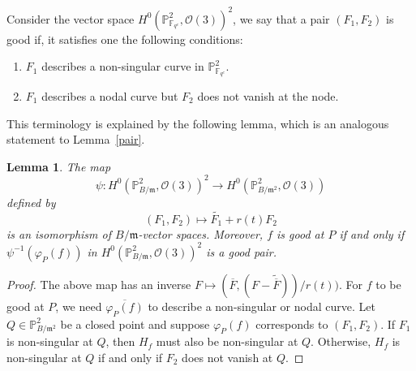 \documentclass[12pt]{article}
\theoremstyle{plain}
\newtheorem{lemma}[equation]{Lemma}
\theoremstyle{definition}
\newcommand{\fm}{\mathfrak{m}}
\newcommand{\IF}{\mathbb{F}}
\newcommand{\IP}{\mathbb{P}}
\newcommand{\sO}{\mathcal{O}}
\newcommand{\<}{\langle}
\renewcommand{\>}{\rangle}
\def\wt{\widetilde}
\begin{document}
Consider the vector space $H^0(\IP^2_{\IF_{q^e}}, \sO(3))^2$, we say that a pair $(F_1, F_2)$ is good if, it satisfies one the following conditions:
\begin{enumerate}
\item $F_1$ describes a non-singular curve in $\IP^2_{\IF_{q^e}}$.
\item $F_1$ describes a nodal curve but $F_2$ does not vanish at the node.
\end{enumerate}  
This terminology is explained by the following lemma, which is an analogous statement to Lemma~\ref{pair}. 
\begin{lemma}
\label{conversion}
The map
$$ \psi : H^0(\IP^2_{B/\fm} , \sO(3))^2 \to H^0(\IP^2_{B/\fm^2}, \sO(3))$$ defined by 
$$ (F_1, F_2) \mapsto \wt{F_1} + r(t) F_2 $$
is an isomorphism of $B/\fm$-vector spaces. Moreover, $f$ is good at $P$ if and only if $\psi^{-1}(\varphi_P(f))$ in $H^0(\IP^2_{B/\fm} , \sO(3))^2$ is a good pair. 
\end{lemma}
\begin{proof}
The above map has an inverse $F \mapsto (\overline{F}, (F - \wt{\overline{F}}))/r(t))$. For $f$ to be good at $P$, we need $\overline{\varphi_P(f)}$ to describe a non-singular or nodal curve. Let $Q \in \IP^2_{B/\fm^2}$ be a closed point and suppose $\varphi_P(f)$ corresponds to $(F_1, F_2)$. If $F_1$ is non-singular at $Q$, then $H_f$ must also be non-singular at $Q$. Otherwise, $H_f$ is non-singular at $Q$ if and only if $F_2$ does not vanish at $Q$. 
\end{proof}
\end{document}
